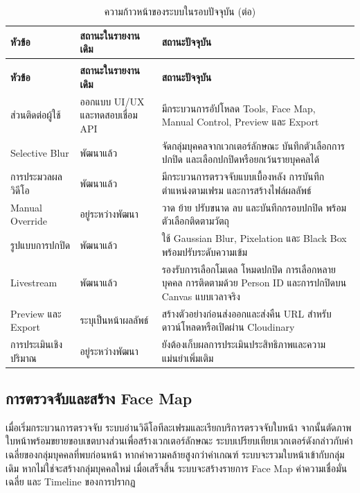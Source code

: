\begingroup
\setlength{\tabcolsep}{4pt}
\renewcommand{\arraystretch}{1.1}
\setlength{\LTpre}{0.4\baselineskip}
\setlength{\LTpost}{0.4\baselineskip}
\captionsetup[table]{skip=0.5\baselineskip}
\small
\setlength{\LTcapwidth}{\textwidth}
\begin{longtable}{|p{}|p{}|p{}|}
\caption{ความก้าวหน้าของระบบในรอบปัจจุบัน}
\label{tab:progress-update}\\
\hline
\textbf{หัวข้อ} & \textbf{สถานะในรายงานเดิม} & \textbf{สถานะปัจจุบัน} \\
\hline
\endfirsthead
\caption[]{ความก้าวหน้าของระบบในรอบปัจจุบัน (ต่อ)}\\
\hline
\textbf{หัวข้อ} & \textbf{สถานะในรายงานเดิม} & \textbf{สถานะปัจจุบัน} \\
\hline
\endhead
ส่วนติดต่อผู้ใช้ & ออกแบบ UI/UX และทดสอบเชื่อม API & มีกระบวนการอัปโหลด Tools, Face Map, Manual Control, Preview และ Export \\
\hline
Selective Blur & พัฒนาแล้ว & จัดกลุ่มบุคคลจากเวกเตอร์ลักษณะ บันทึกตัวเลือกการปกปิด และเลือกปกปิดหรือยกเว้นรายบุคคลได้ \\
\hline
การประมวลผลวิดีโอ & พัฒนาแล้ว & มีกระบวนการตรวจจับแบบเบื้องหลัง การบันทึกตำแหน่งตามเฟรม และการสร้างไฟล์ผลลัพธ์ \\
\hline
Manual Override & อยู่ระหว่างพัฒนา & วาด ย้าย ปรับขนาด ลบ และบันทึกกรอบปกปิด พร้อมตัวเลือกติดตามวัตถุ \\
\hline
รูปแบบการปกปิด & พัฒนาแล้ว & ใช้ Gaussian Blur, Pixelation และ Black Box พร้อมปรับระดับความเข้ม \\
\hline
Livestream & พัฒนาแล้ว & รองรับการเลือกโมเดล โหมดปกปิด การเลือกหลายบุคคล การติดตามด้วย Person ID และการปกปิดบน Canvas แบบเวลาจริง \\
\hline
Preview และ Export & ระบุเป็นหน้าผลลัพธ์ & สร้างตัวอย่างก่อนส่งออกและส่งคืน URL สำหรับดาวน์โหลดหรือเปิดผ่าน Cloudinary \\
\hline
การประเมินเชิงปริมาณ & อยู่ระหว่างพัฒนา & ยังต้องเก็บผลการประเมินประสิทธิภาพและความแม่นยำเพิ่มเติม \\
\hline
\end{longtable}
\endgroup

\subsection{การตรวจจับและสร้าง Face Map}

เมื่อเริ่มกระบวนการตรวจจับ ระบบอ่านวิดีโอทีละเฟรมและเรียกบริการตรวจจับใบหน้า จากนั้นตัดภาพใบหน้าพร้อมขยายขอบเขตบางส่วนเพื่อสร้างเวกเตอร์ลักษณะ ระบบเปรียบเทียบเวกเตอร์ดังกล่าวกับค่าเฉลี่ยของกลุ่มบุคคลที่พบก่อนหน้า หากค่าความคล้ายสูงกว่าค่าเกณฑ์ ระบบจะรวมใบหน้าเข้ากับกลุ่มเดิม หากไม่ใช่จะสร้างกลุ่มบุคคลใหม่ เมื่อเสร็จสิ้น ระบบจะสร้างรายการ Face Map ค่าความเชื่อมั่นเฉลี่ย และ Timeline ของการปรากฏ

